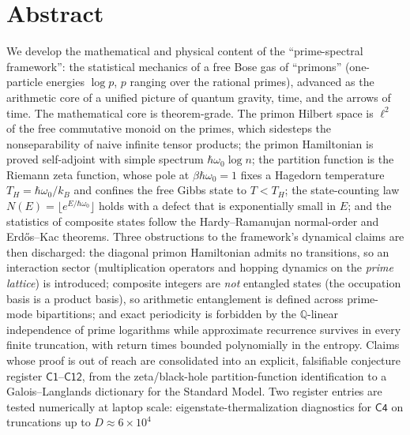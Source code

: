 \documentclass[11pt,a4paper]{article}
\theoremstyle{plain}
\theoremstyle{definition}
\theoremstyle{remark}
\newcommand{\Qq}{\mathbb{Q}}
\begin{document}
\tableofcontents
\newpage


\section*{Abstract}
\noindent
We develop the mathematical and physical content of the ``prime-spectral framework'': the
statistical mechanics of a free Bose gas of ``primons'' (one-particle energies $\log p$, $p$
ranging over the rational primes), advanced as the arithmetic core of a unified picture of
quantum gravity, time, and the arrows of time. The mathematical core is theorem-grade. The
primon Hilbert space is $\ell^{2}$ of the free commutative monoid on the primes, which
sidesteps the nonseparability of naive infinite tensor products; the primon Hamiltonian is
proved self-adjoint with simple spectrum $\hbar\omega_{0}\log n$; the partition function is
the Riemann zeta function, whose pole at $\beta\hbar\omega_{0}=1$ fixes a Hagedorn temperature
$T_{H}=\hbar\omega_{0}/k_{B}$ and confines the free Gibbs state to $T<T_{H}$; the
state-counting law $N(E)=\lfloor e^{E/\hbar\omega_{0}}\rfloor$ holds with a defect that is
exponentially small in $E$; and the statistics of composite states follow the
Hardy--Ramanujan normal-order and Erd\H{o}s--Kac theorems. Three obstructions to the
framework's dynamical claims are then discharged: the diagonal primon Hamiltonian admits no
transitions, so an interaction sector (multiplication operators and hopping dynamics on the
\emph{prime lattice}) is introduced; composite integers are \emph{not} entangled states (the
occupation basis is a product basis), so arithmetic entanglement is defined across prime-mode
bipartitions; and exact periodicity is forbidden by the $\Qq$-linear independence of prime
logarithms while approximate recurrence survives in every finite truncation, with return
times bounded polynomially in the entropy. Claims whose proof is out of reach are consolidated
into an explicit, falsifiable conjecture register $\mathsf{C1}$--$\mathsf{C12}$, from the
zeta/black-hole partition-function identification to a Galois--Langlands dictionary for the
Standard Model. Two register entries are tested numerically at laptop scale:
eigenstate-thermalization diagnostics for $\mathsf{C4}$ on truncations up to $D\approx6\times10^{4}$
\end{document}
